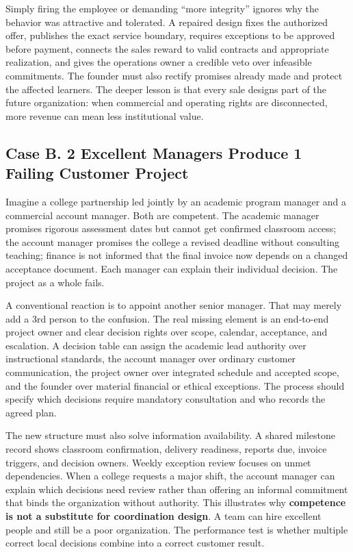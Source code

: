 Simply firing the employee or demanding ``more integrity'' ignores why the behavior was attractive and tolerated. A repaired design fixes the authorized offer, publishes the exact service boundary, requires exceptions to be approved before payment, connects the sales reward to valid contracts and appropriate realization, and gives the operations owner a credible veto over infeasible commitments. The founder must also rectify promises already made and protect the affected learners. The deeper lesson is that every sale designs part of the future organization: when commercial and operating rights are disconnected, more revenue can mean less institutional value.

\subsection*{Case B. 2 Excellent Managers Produce 1 Failing Customer Project}

Imagine a college partnership led jointly by an academic program manager and a commercial account manager. Both are competent. The academic manager promises rigorous assessment dates but cannot get confirmed classroom access; the account manager promises the college a revised deadline without consulting teaching; finance is not informed that the final invoice now depends on a changed acceptance document. Each manager can explain their individual decision. The project as a whole fails.

A conventional reaction is to appoint another senior manager. That may merely add a 3rd person to the confusion. The real missing element is an end-to-end project owner and clear decision rights over scope, calendar, acceptance, and escalation. A decision table can assign the academic lead authority over instructional standards, the account manager over ordinary customer communication, the project owner over integrated schedule and accepted scope, and the founder over material financial or ethical exceptions. The process should specify which decisions require mandatory consultation and who records the agreed plan.

The new structure must also solve information availability. A shared milestone record shows classroom confirmation, delivery readiness, reports due, invoice triggers, and decision owners. Weekly exception review focuses on unmet dependencies. When a college requests a major shift, the account manager can explain which decisions need review rather than offering an informal commitment that binds the organization without authority. This illustrates why \textbf{competence is not a substitute for coordination design}. A team can hire excellent people and still be a poor organization. The performance test is whether multiple correct local decisions combine into a correct customer result.

